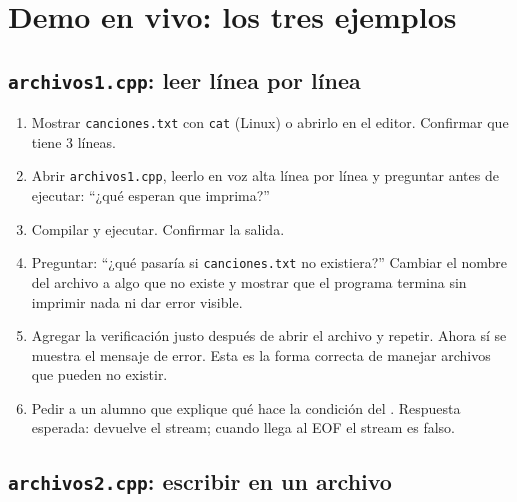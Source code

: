 \documentclass[12pt, oneside]{article}
\begin{document}
\section{Demo en vivo: los tres ejemplos}

\subsection{\texttt{archivos1.cpp}: leer línea por línea}

\begin{notaprofesor}
  \begin{enumerate}
    \item Mostrar \texttt{canciones.txt} con \texttt{cat} (Linux) o
          abrirlo en el editor.  Confirmar que tiene 3 líneas.
    \item Abrir \texttt{archivos1.cpp}, leerlo en voz alta línea por línea
          y preguntar antes de ejecutar: ``¿qué esperan que imprima?''
    \item Compilar y ejecutar.  Confirmar la salida.
    \item Preguntar: ``¿qué pasaría si \texttt{canciones.txt} no existiera?''
          Cambiar el nombre del archivo a algo que no existe y mostrar
          que el programa termina sin imprimir nada ni dar error visible.
    \item Agregar la verificación  justo después de abrir
          el archivo y repetir.  Ahora sí se muestra el mensaje de error.
          Esta es la forma correcta de manejar archivos que pueden no existir.
    \item Pedir a un alumno que explique qué hace la condición del
          .  Respuesta esperada: 
          devuelve el stream; cuando llega al EOF el stream es falso.
  \end{enumerate}
\end{notaprofesor}

\subsection{\texttt{archivos2.cpp}: escribir en un archivo}
\end{document}
